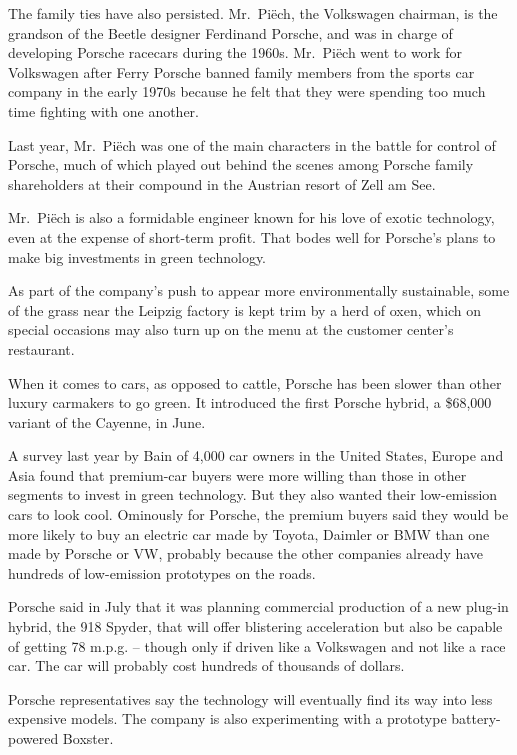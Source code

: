 ﻿\documentclass[12pt]{article}
\begin{document}
The family ties have also persisted. Mr.~Pi\"ech, the Volkswagen chairman, is the grandson of the
Beetle designer Ferdinand Porsche, and was in charge of developing Porsche racecars during the
1960s. Mr.~Pi\"ech went to work for Volkswagen after Ferry Porsche banned family members from the
sports car company in the early 1970s because he felt that they were spending too much time fighting
with one another.

Last year, Mr.~Pi\"ech was one of the main characters in the battle for control of Porsche, much of
which played out behind the scenes among Porsche family shareholders at their compound in the
Austrian resort of Zell am See.

Mr.~Pi\"ech is also a formidable engineer known for his love of exotic technology, even at the
expense of short-term profit. That bodes well for Porsche's plans to make big investments in green
technology.

As part of the company's push to appear more environmentally sustainable, some of the grass near the
Leipzig factory is kept trim by a herd of oxen, which on special occasions may also turn up on the
menu at the customer center's restaurant.

When it comes to cars, as opposed to cattle, Porsche has been slower than other luxury carmakers to
go green. It introduced the first Porsche hybrid, a \$68,000 variant of the Cayenne, in June.

A survey last year by Bain of 4,000 car owners in the United States, Europe and Asia found that
premium-car buyers were more willing than those in other segments to invest in green technology. But
they also wanted their low-emission cars to look cool. Ominously for Porsche, the premium buyers
said they would be more likely to buy an electric car made by Toyota, Daimler or BMW than one made
by Porsche or VW, probably because the other companies already have hundreds of low-emission
prototypes on the roads.

Porsche said in July that it was planning commercial production of a new plug-in hybrid, the 918
Spyder, that will offer blistering acceleration but also be capable of getting 78 m.p.g. -- though
only if driven like a Volkswagen and not like a race car. The car will probably cost hundreds of
thousands of dollars.

Porsche representatives say the technology will eventually find its way into less expensive models.
The company is also experimenting with a prototype battery-powered Boxster.
\end{document}
